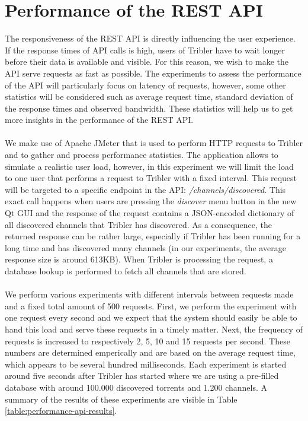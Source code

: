 \section{Performance of the REST API}
The responsiveness of the REST API is directly influencing the user experience. If the response times of API calls is high, users of Tribler have to wait longer before their data is available and visible. For this reason, we wish to make the API serve requests as fast as possible. The experiments to assess the performance of the API will particularly focus on latency of requests, however, some other statistics will be considered such as average request time, standard deviation of the response times and observed bandwidth. These statistics will help us to get more insights in the performance of the REST API.\\\\
We make use of Apache JMeter\cite{jmeter2010apache} that is used to perform HTTP requests to Tribler and to gather and process performance statistics. The application allows to simulate a realistic user load, however, in this experiment we will limit the load to one user that performs a request to Tribler with a fixed interval. This request will be targeted to a specific endpoint in the API: \emph{/channels/discovered}. This exact call happens when users are pressing the \emph{discover} menu button in the new Qt GUI and the response of the request contains a JSON-encoded dictionary of all discovered channels that Tribler has discovered. As a consequence, the returned response can be rather large, especially if Tribler has been running for a long time and has discovered many channels (in our experiments, the average response size is around 613KB). When Tribler is processing the request, a database lookup is performed to fetch all channels that are stored.\\\\
We perform various experiments with different intervals between requests made and a fixed total amount of 500 requests. First, we perform the experiment with one request every second and we expect that the system should easily be able to hand this load and serve these requests in a timely matter. Next, the frequency of requests is increased to respectively 2, 5, 10 and 15 requests per second. These numbers are determined emperically and are based on the average request time, which appears to be several hundred milliseconds. Each experiment is started around five seconds after Tribler has started where we are using a pre-filled database with around 100.000 discovered torrents and 1.200 channels. A summary of the results of these experiments are visible in Table \ref{table:performance-api-results}.\\

